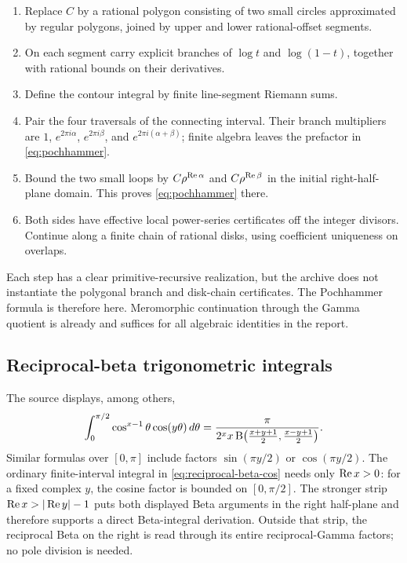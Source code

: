 \begin{enumerate}
\item Replace $C$ by a rational polygon consisting of two small circles approximated by regular polygons, joined by upper and lower rational-offset segments.
\item On each segment carry explicit branches of $\log t$ and $\log(1-t)$, together with rational bounds on their derivatives.
\item Define the contour integral by finite line-segment Riemann sums.
\item Pair the four traversals of the connecting interval.  Their branch multipliers are
$1$, $e^{2\pi i\alpha}$, $e^{2\pi i\beta}$, and
$e^{2\pi i(\alpha+\beta)}$; finite algebra leaves the prefactor in
\eqref{eq:pochhammer}.
\item Bound the two small loops by
$C\rho^{\operatorname{Re}\alpha}$ and $C\rho^{\operatorname{Re}\beta}$ in the initial right-half-plane domain.  This proves \eqref{eq:pochhammer} there.
\item Both sides have effective local power-series certificates off the integer divisors.  Continue along a finite chain of rational disks, using coefficient uniqueness on overlaps.
\end{enumerate}

Each step has a clear primitive-recursive realization, but the archive does not instantiate the polygonal branch and disk-chain certificates.  The Pochhammer formula is therefore \statusC{} here.  Meromorphic continuation through the Gamma quotient is already \statusB{} and suffices for all algebraic identities in the report.

\subsection{Reciprocal-beta trigonometric integrals}

The source displays, among others,
\begin{equation}
 \int_0^{\pi/2}\cos^{x-1}\theta\cos(y\theta)\,d\theta
 =
 \frac{\pi}
 {2^x x\,
 \mathrm B\!\left(\frac{x+y+1}{2},\frac{x-y+1}{2}\right)}.
 \label{eq:reciprocal-beta-cos}
\end{equation}
Similar formulas over $[0,\pi]$ include factors
$\sin(\pi y/2)$ or $\cos(\pi y/2)$.  The ordinary finite-interval integral in
\eqref{eq:reciprocal-beta-cos} needs only $\operatorname{Re} x>0$: for a fixed complex
$y$, the cosine factor is bounded on $[0,\pi/2]$.  The stronger strip
$\operatorname{Re} x>|\operatorname{Re} y|-1$ puts both displayed Beta arguments in the right half-plane
and therefore supports a direct Beta-integral derivation.  Outside that strip,
the reciprocal Beta on the right is read through its entire reciprocal-Gamma
factors; no pole division is needed.

